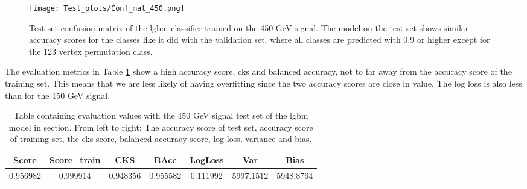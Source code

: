 \documentclass[a4paper, american, 12pt]{report}
\begin{document}
	\begin{figure}[htb!]
		\centering\texttt{[image: Test\_plots/Conf\_mat\_450.png]}
		\caption[Test set confusion matrix for the \acrshort{lgbm} model trained on the 150 GeV signal.]{Test set confusion matrix of the \acrshort{lgbm} classifier trained on the 450 GeV signal. The model on the test set shows similar accuracy scores for the classes like it did with the validation set, where all classes are predicted with 0.9 or higher except for the 123 vertex permutation class. \label{fig:ConfTest_450}}
	\end{figure}
	
	The evaluation metrics in Table \ref{tab:Test_450} show a high accuracy score, \acrshort{cks} and balanced accuracy, not to far away from the accuracy score of the training set. This means that we are less likely of having overfitting since the two accuracy scores are close in value. The log loss is also less than for the 150 GeV signal.
	\begin{table}[htb!]
		\hspace{-0.8cm}
		\begin{tabular}{ |c|c|c|c|c|c|c| }
			\hline \rule{0pt}{13pt}
			Score & Score\_train & CKS & BAcc & LogLoss & Var & Bias \\
			\hline \rule{0pt}{13pt}
			0.956982 & 0.999914 & 0.948356 & 0.955582 &  0.111992 & 5997.1512 & 5948.8764 \\
			\hline
		\end{tabular}	         
		\caption[Evaluation with 450 Gev signal test set.]{Table containing evaluation values with the 450 GeV signal test set of the \acrshort{lgbm} model in section. From left to right: The accuracy score of test set, accuracy score of training set, the \acrshort{cks} score, balanced accuracy score, log loss, variance and bias.}
		\label{tab:Test_450}
	\end{table}
	
\end{document}
